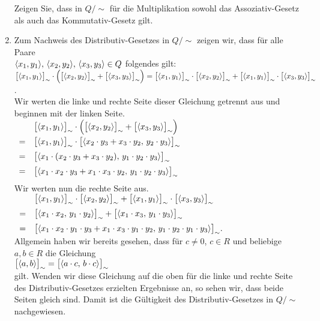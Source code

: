 \begin{enumerate}
      \exercise
      Zeigen Sie, dass in $Q/\!\sim$ f\"{u}r die Multiplikation sowohl das Assoziativ-Gesetz als auch das
      Kommutativ-Gesetz gilt.
\item Zum Nachweis des Distributiv-Gesetzes in $Q/\!\sim$ 
      zeigen wir, dass f\"{u}r alle Paare \\
      $\pair(x_1,y_1),\, \pair(x_2,y_2),\, \pair(x_3,y_3) \in Q$
      folgendes gilt:
      \\[0.2cm]
      \hspace*{0.3cm}
      $
      \bpr(x_1,y_1) \cdot \Bigl(\bpr(x_2,y_2) + \bpr(x_3,y_3)\Bigr) =
      \bpr(x_1,y_1) \cdot \bpr(x_2,y_2) + \bpr(x_1,y_1) \cdot \bpr(x_3,y_3)
      $.
      \\[0.2cm]
      Wir werten die linke und rechte Seite dieser Gleichung getrennt aus und beginnen mit der
      linken Seite. 
      \\[0.2cm]
      \hspace*{1.3cm}
      $
      \begin{array}[t]{cl}
        & \bpr(x_1,y_1) \cdot \Bigl(\bpr(x_2,y_2) + \bpr(x_3,y_3)\Bigr)                     \\[0.2cm]
      = & \bpr(x_1,y_1) \cdot \bpr(x_2 \cdot y_3 + x_3 \cdot y_2,\,y_2 \cdot y_3)           \\[0.2cm]
      = & \bpr(x_1 \cdot \kla x_2 \cdot y_3 + x_3 \cdot y_2\klz,\,y_1 \cdot y_2 \cdot y_3)  \\[0.2cm]
      = & \bpr(x_1 \cdot x_2 \cdot y_3 + x_1 \cdot x_3 \cdot y_2,\,y_1 \cdot y_2 \cdot y_3) \\[0.2cm]
      \end{array}
      $
      \\[0.2cm]
      Wir werten nun die rechte Seite aus.
      \\[0.2cm]
      \hspace*{1.3cm}
      $
      \begin{array}[t]{cl}
      & \bpr(x_1,y_1) \cdot \bpr(x_2,y_2) + \bpr(x_1,y_1) \cdot \bpr(x_3,y_3)        \\[0.2cm]
      = & \bpr(x_1 \cdot x_2,\, y_1 \cdot y_2) + \bpr(x_1 \cdot x_3,\,y_1 \cdot y_3)   \\[0.2cm]
      = & \bpr(x_1 \cdot x_2 \cdot y_1 \cdot y_3 + x_1 \cdot x_3 \cdot y_1 \cdot y_2,\, 
      y_1 \cdot y_2 \cdot y_1 \cdot y_3). 
      \end{array}
      $
      \\[0.2cm]
      Allgemein haben wir bereits gesehen, dass f\"{u}r $c \not= 0$, $c \in R$ und beliebige $a,b \in R$ die Gleichung
      \\[0.2cm]
      \hspace*{1.3cm}
      $\bpr(a,b) = \bpr(a \cdot c,\,b \cdot c)$
      \\[0.2cm]
      gilt.  Wenden wir diese Gleichung  auf die oben f\"{u}r die linke und rechte Seite des
      Distributiv-Gesetzes erzielten Ergebnisse an, so sehen wir, dass beide Seiten gleich sind.
      Damit ist die G\"{u}ltigkeit des Distributiv-Gesetzes in $Q/\!\sim$ nachgewiesen.  
\end{enumerate}
